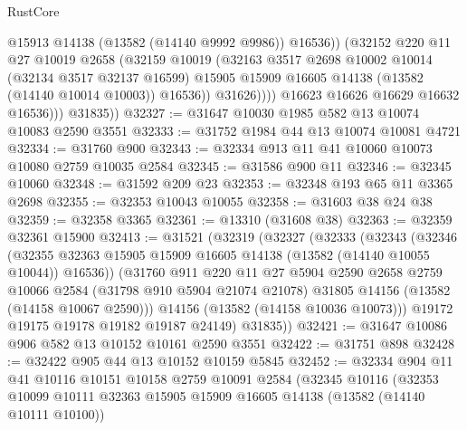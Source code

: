\begin{lexlean}{RustCore}
\begin{coremodule}
                        @15913
                        @14138
                        (@13582 (@14140 @9992 @9986))
                        @16536))
                    (@32152
                      @220
                      @11
                      @27
                      @10019
                      @2658
                      (@32159
                        @10019
                        (@32163
                          @3517
                          @2698
                          @10002
                          @10014
                          (@32134 @3517 @32137 @16599)
                          @15905
                          @15909
                          @16605
                          @14138
                          (@13582 (@14140 @10014 @10003))
                          @16536))
                      @31626))))
              @16623
              @16626
              @16629
              @16632
              @16536)))
        @31835))
@32327 := @31647 @10030 @1985 @582 @13 @10074 @10083 @2590 @3551
@32333 := @31752 @1984 @44 @13 @10074 @10081 @4721
@32334 := @31760 @900
@32343 := @32334 @913 @11 @41 @10060 @10073 @10080 @2759 @10035 @2584
@32345 := @31586 @900 @11
@32346 := @32345 @10060
@32348 := @31592 @209 @23
@32353 := @32348 @193 @65 @11 @3365 @2698
@32355 := @32353 @10043 @10055
@32358 := @31603 @38 @24 @38
@32359 := @32358 @3365
@32361 := @13310 (@31608 @38)
@32363 := @32359 @32361 @15900
@32413 := @31521
    (@32319
      (@32327
        (@32333
          (@32343
            (@32346
              (@32355 @32363 @15905 @15909 @16605 @14138 (@13582 (@14140 @10055 @10044)) @16536))
            (@31760
              @911
              @220
              @11
              @27
              @5904
              @2590
              @2658
              @2759
              @10066
              @2584
              (@31798 @910 @5904 @21074 @21078)
              @31805
              @14156
              (@13582 (@14158 @10067 @2590)))
            @14156
            (@13582 (@14158 @10036 @10073)))
          @19172
          @19175
          @19178
          @19182
          @19187
          @24149)
        @31835))
@32421 := @31647 @10086 @906 @582 @13 @10152 @10161 @2590 @3551
@32422 := @31751 @898
@32428 := @32422 @905 @44 @13 @10152 @10159 @5845
@32452 := @32334
    @904
    @11
    @41
    @10116
    @10151
    @10158
    @2759
    @10091
    @2584
    (@32345
      @10116
      (@32353
        @10099
        @10111
        @32363
        @15905
        @15909
        @16605
        @14138
        (@13582 (@14140 @10111 @10100))

\end{coremodule}
\end{lexlean}
